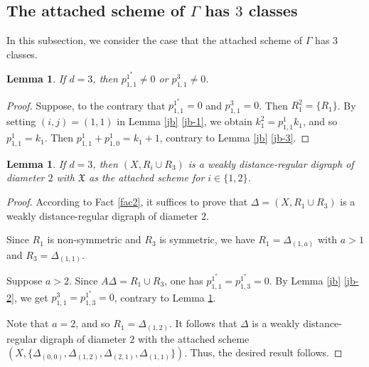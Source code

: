 \documentclass[12pt,a4paper]{amsart}
\newtheorem{lemma}[thm]{Lemma}
\theoremstyle{definition}
\begin{document}
\subsection{The attached scheme of $\Gamma$ has $3$ classes} In this subsection, we consider the case that the attached scheme of $\Gamma$ has $3$ classes.
\begin{lemma}\label{lem3.5}
If $d=3$, then $p_{1,1}^{1^{*}}\neq 0$ or $p_{1,1}^{3}\neq 0$.
\end{lemma}
\begin{proof}
Suppose, to the contrary that $p_{1,1}^{1^{*}}=0$ and $p_{1,1}^{3}=0$. Then $R_1^2=\{R_1\}$. By setting $(i,j)=(1,1)$ in Lemma \ref{jb} \ref{jb-1}, we obtain $k_1^2=p_{1,1}^1k_1$, and so $p_{1,1}^1=k_1$. Then $p_{1,1}^1+p_{1,0}^1=k_{1}+1$, contrary to Lemma \ref{jb} \ref{jb-3}.
\end{proof}

\begin{lemma}\label{lem3.6}
If $d=3$, then $(X,R_i\cup R_3)$ is a weakly distance-regular digraph of diameter $2$ with $\mathfrak{X}$ as the attached scheme for $i\in\{1,2\}$.
\end{lemma}
\begin{proof}
According to Fact \ref{fac2}, it suffices to prove that $\Delta=(X,R_1\cup R_3)$ is a weakly distance-regular digraph of diameter $2$.

Since $R_1$ is non-symmetric and $R_3$ is symmetric, we have $R_1=\Delta_{(1,a)}$  with $a>1$ and $R_3=\Delta_{(1,1)}$.

Suppose $a>2$. Since $A\Delta=R_1\cup R_3$, one has $p_{1,1}^{1^{*}}=p_{1,3}^{1^{*}}=0$. By Lemma \ref{jb} \ref{jb-2}, we get $p_{1,1}^{3}=p_{1,3}^{1^{*}}=0$, contrary to Lemma \ref{lem3.5}.

Note that $a=2$, and so $R_1=\Delta_{(1,2)}$. It follows that $\Delta$ is a weakly distance-regular digraph of diameter $2$ with the attached scheme $(X,\{\Delta_{(0,0)},\Delta_{(1,2)},\Delta_{(2,1)},\Delta_{(1,1)}\}).$ Thus, the desired result follows.
\end{proof}
\end{document}
